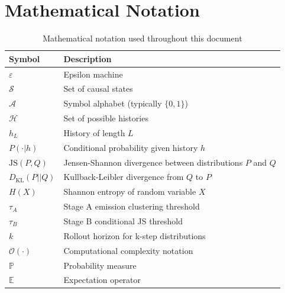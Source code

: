 \documentclass[11pt,a4paper]{report}
\newcommand{\JS}{\text{JS}}
\newcommand{\KL}{D_{\text{KL}}}
\newcommand{\epsmachine}{\varepsilon}
\newcommand{\states}{\mathcal{S}}
\newcommand{\alphabet}{\mathcal{A}}
\newcommand{\histories}{\mathcal{H}}
\newcommand{\prob}{\mathbb{P}}
\newcommand{\expect}{\mathbb{E}}
\newcommand{\bigO}{\mathcal{O}}
\theoremstyle{definition}
\begin{document}
\newpage
\setcounter{tocdepth}{2}
\tableofcontents

\newpage
\listoffigures
{}

\newpage
\listoftables
{}

\newpage
\listofalgorithms
{}

\newpage
\chapter*{Mathematical Notation}

\begin{table}[h]
\centering
\begin{tabular}{ll}
\toprule
\textbf{Symbol} & \textbf{Description} \\
\midrule
$\epsmachine$ & Epsilon machine \\
$\states$ & Set of causal states \\
$\alphabet$ & Symbol alphabet (typically $\{0,1\}$) \\
$\histories$ & Set of possible histories \\
$h_L$ & History of length $L$ \\
$P(\cdot|h)$ & Conditional probability given history $h$ \\
$\JS(P,Q)$ & Jensen-Shannon divergence between distributions $P$ and $Q$ \\
$\KL(P||Q)$ & Kullback-Leibler divergence from $Q$ to $P$ \\
$H(X)$ & Shannon entropy of random variable $X$ \\
$\tau_A$ & Stage A emission clustering threshold \\
$\tau_B$ & Stage B conditional JS threshold \\
$k$ & Rollout horizon for k-step distributions \\
$\bigO(\cdot)$ & Computational complexity notation \\
$\prob$ & Probability measure \\
$\expect$ & Expectation operator \\
\bottomrule
\end{tabular}
\caption{Mathematical notation used throughout this document}
\end{table}

\newpage
{}
\setcounter{page}{1}
\end{document}
